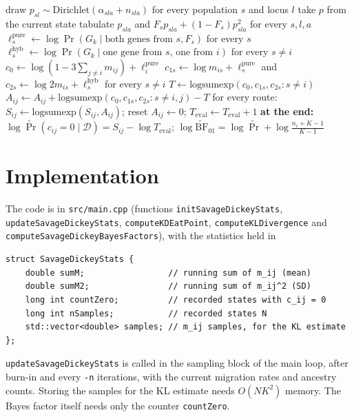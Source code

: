 \documentclass[11pt,a4paper]{article}
\newcommand{\BF}{\mathrm{BF}}
\newcommand{\data}{\mathcal{D}}
\newcommand{\1}{\mathbf{1}}
\begin{document}
\begin{algorithm}[H]
\caption{Exact Bayes factors (\texttt{-B}~$K$), one evaluation}
\begin{algorithmic}[1]
  \State draw $p_{sl}\sim\mathrm{Dirichlet}(\alpha_{sla}+n_{sla})$ for every population $s$ and locus $l$ 
\Else
  \State take $p$ from the current state
\EndIf
\State tabulate $p_{sla}$ and $F_sp_{sla}+(1-F_s)p_{sla}^2$ for every $s,l,a$
  \State $\ell^{\mathrm{pure}}_s \gets \log\Pr(G_k\mid\text{both genes from } s, F_s)$ for every $s$ 
  \State $\ell^{\mathrm{hyb}}_s \gets \log\Pr(G_k\mid\text{one gene from } s\text{, one from } i)$ for every $s\neq i$
  \State $c_0 \gets \log(1-3\textstyle\sum_{j\neq i} m_{ij}) + \ell^{\mathrm{pure}}_i$
  \State $c_{1s} \gets \log m_{is}+\ell^{\mathrm{pure}}_s$ and $c_{2s}\gets\log 2m_{is}+\ell^{\mathrm{hyb}}_s$ for every $s\neq i$
  \State $T \gets \mathrm{logsumexp}(c_0, c_{1s}, c_{2s}: s\neq i)$
    \State $A_{ij} \gets A_{ij} + \mathrm{logsumexp}(c_0, c_{1s}, c_{2s}: s\neq i,j) - T$ 
  \EndFor
\EndFor
\State for every route: $S_{ij}\gets\mathrm{logsumexp}(S_{ij}, A_{ij})$; reset $A_{ij}\gets 0$; $T_{\mathrm{eval}}\gets T_{\mathrm{eval}}+1$
\State \textbf{at the end:} $\log\widetilde{\Pr}(c_{ij}=0\mid\data) = S_{ij}-\log T_{\mathrm{eval}}$; $\log\widetilde{\BF}_{01} = \log\widetilde{\Pr} + \log\frac{n_i+K-1}{K-1}$
\end{algorithmic}
\end{algorithm}

\section{Implementation}

The code is in \texttt{src/main.cpp} (functions \texttt{initSavageDickeyStats},
\texttt{updateSavageDickeyStats}, \texttt{computeKDEatPoint},
\texttt{computeKLDivergence} and \texttt{computeSavageDickeyBayesFactors}), with
the statistics held in
\begin{verbatim}
struct SavageDickeyStats {
    double sumM;                 // running sum of m_ij (mean)
    double sumM2;                // running sum of m_ij^2 (SD)
    long int countZero;          // recorded states with c_ij = 0
    long int nSamples;           // recorded states N
    std::vector<double> samples; // m_ij samples, for the KL estimate
};
\end{verbatim}
\texttt{updateSavageDickeyStats} is called in the sampling block of the main
loop, after burn-in and every \texttt{-n} iterations, with the current
migration rates and ancestry counts. Storing the samples for the KL estimate
needs $O(NK^2)$ memory. The Bayes factor itself needs only the counter
\texttt{countZero}.
\end{document}
